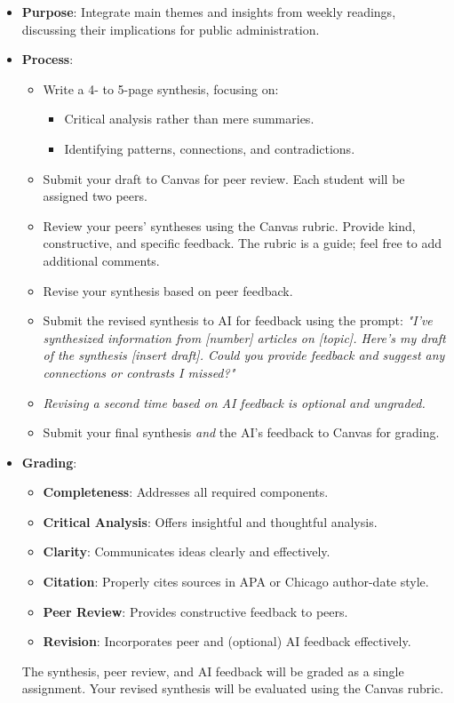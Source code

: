 \documentclass[12pt, letterpaper]{article}
\newenvironment{boldnumlist}
{\begin{enumerate}[label=\textbf{\arabic*.}]}
{\end{enumerate}}
\begin{document}
\begin{boldnumlist}
\begin{itemize}
    \item \textbf{Purpose}: Integrate main themes and insights from weekly readings, discussing their implications for public administration.
    \item \textbf{Process}:
    \begin{itemize}
        \item Write a 4- to 5-page synthesis, focusing on:
        \begin{itemize}
            \item Critical analysis rather than mere summaries.
            \item Identifying patterns, connections, and contradictions.
        \end{itemize}
        \item Submit your draft to Canvas for peer review. Each student will be assigned two peers.
        \item Review your peers' syntheses using the Canvas rubric. Provide kind, constructive, and specific feedback. The rubric is a guide; feel free to add additional comments.
        \item Revise your synthesis based on peer feedback.
        \item Submit the revised synthesis to AI for feedback using the prompt:
        \textit{"I've synthesized information from [number] articles on [topic]. Here's my draft of the synthesis [insert draft]. Could you provide feedback and suggest any connections or contrasts I missed?"}
        \item \emph{Revising a second time based on AI feedback is optional and ungraded.}
        \item Submit your final synthesis \emph{and} the AI's feedback to Canvas for grading.
    \end{itemize}
    \item \textbf{Grading}:
    \begin{itemize}
        \item \textbf{Completeness}: Addresses all required components.
        \item \textbf{Critical Analysis}: Offers insightful and thoughtful analysis.
        \item \textbf{Clarity}: Communicates ideas clearly and effectively.
        \item \textbf{Citation}: Properly cites sources in APA or Chicago author-date style.
        \item \textbf{Peer Review}: Provides constructive feedback to peers.
        \item \textbf{Revision}: Incorporates peer and (optional) AI feedback effectively.
    \end{itemize}
    The synthesis, peer review, and AI feedback will be graded as a single assignment. Your revised synthesis will be evaluated using the Canvas rubric.
\end{itemize}


\end{boldnumlist}
\end{document}
